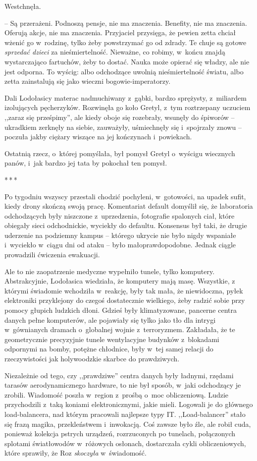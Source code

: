 \documentclass[oneside,polish,11pt,sfheadings]{mwbk}
\newcommand{\threeast}{\bigskip\par\centerline{*\,*\,*}\medskip\par}
\begin{document}
Westchnęła. 

-- Są przerażeni. Podnoszą pensje, nie ma znaczenia.
Benefity, nie ma znaczenia. Oferują akcje, nie ma znaczenia. Przyjaciel
przysięga, że pewien zetta chciał wżenić go w~rodzinę, tylko żeby
powstrzymać go od zdrady. Te chuje są gotowe \textit{sprzedać dzieci} za
nieśmiertelność. Nieważne, co robimy, w~końcu znajdą wystarczająco
fartuchów, żeby to dostać. Nauka może opierać się władzy, ale nie jest
odporna. To wyścig: albo odchodzące uwolnią nieśmiertelność światu, albo
zetta zainstalują się jako wieczni bogowie-imperatorzy.

Dali Lodołasicy materac nadmuchiwany z~gąbki, bardzo sprężysty, z~miliardem izolujących pęcherzyków. Rozwinęła go koło Gretyl, z~tym
roztrzepany uczuciem ,,zaraz się prześpimy'', ale kiedy oboje się
rozebrały, wsunęły do śpiworów -- ukradkiem zerknęły na siebie,
zauważyły, uśmiechnęły się i~spojrzały znowu -- poczuła jakby ciężary
wiszące na jej kończynach i~powiekach.

Ostatnią rzecz, o~której pomyślała, był pomysł Gretyl o~wyścigu
wiecznych panów, i~jak bardzo jej tata by pokochał ten pomysł.

\threeast

Po tygodniu wszyscy przestali chodzić pochyleni, w~gotowości, na upadek
sufit, kiedy drony skończą swoją pracę. Komentariat default domyślił
się, że laboratoria odchodzących były niszczone z~uprzedzenia,
fotografie spalonych ciał, które obiegały sieci odchodnickie, wyciekły
do defaultu. Konsensus był taki, że drugie uderzenie na podziemny kampus
-- którego ukrycie nie było nigdy wspaniałe i~wyciekło w~ciągu dni od
ataku -- było małoprawdopodobne. Jednak ciągle prowadzili ćwiczenia
ewakuacji.

Ale to nie zaopatrzenie medyczne wypełniło tunele, tylko komputery.
Abstrakcyjnie, Lodołasica wiedziała, że komputery mają masę. Wszystkie,
z którymi świadomie wchodziła w~reakcję, były tak mała, że niewidoczna,
pyłek elektroniki przyklejony do czegoś dostatecznie wielkiego, żeby
radzić sobie przy pomocy głupich ludzkich dłoni. Gdzieś były
klimatyzowane, pancerne centra danych pełne komputerów, ale pojawiały
się tylko jako tło dla intrygi w~gównianych dramach o~globalnej wojnie z~terroryzmem. Zakładała, że te geometrycznie precyzyjnie tunele
wentylacyjne budynków z~blokadami odpornymi na bomby, potężne chłodnice,
były w~tej samej relacji do rzeczywistości jak holywoodzkie skarbce do
prawdziwych.

Niezależnie od tego, czy ,,prawdziwe'' centra danych były ładnymi,
rzędami tarasów aerodynamicznego hardware, to nie był sposób, w~jaki
odchodzący je zrobili. Wiadomość poszła w~region z~prośbą o~moc
obliczeniową. Ludzie przychodzili z~taką koniami elektronicznymi, jakie
mieli. Logowali je do głównego load-balancera, nad którym pracowali
najlepsze typy IT. ,,Load-balancer'' stało się frazą magika,
przekleństwem i~inwokacją. Coś zawsze było źle, ale robił cuda, ponieważ
kolekcja pstrych urządzeń, rozrzuconych po tunelach, połączonych
splotami światłowodów w~różowych osłonach, dostarczała cykli
obliczeniowych, które sprawiły, że Roz \textit{skoczyła} w~świadomość.
\end{document}
